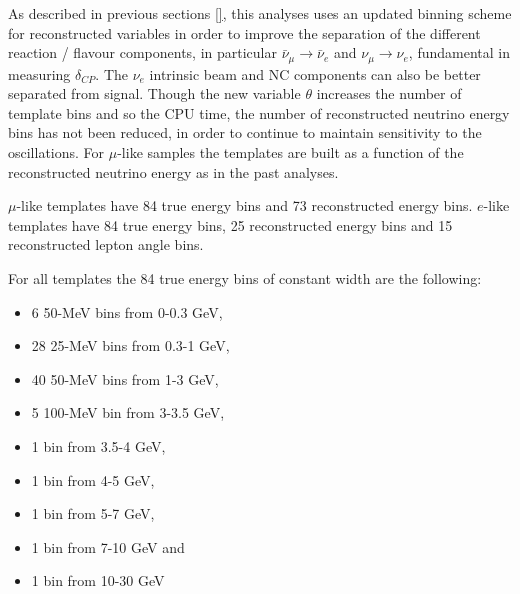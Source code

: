As described in previous sections \cref{}, this analyses uses an updated binning scheme for reconstructed variables
in order to improve the separation of the different reaction / flavour components,
in particular $\bar{\nu}_{\mu} \rightarrow \bar{\nu}_e$ and $\nu_{\mu} \rightarrow \nu_e$,
fundamental in measuring $\delta_{CP}$.
The $\nu_e$ intrinsic beam and NC components can also be better separated from signal.
Though the new variable $\theta$ increases the number of template bins and so the CPU time,
the number of reconstructed neutrino energy bins has not been reduced,
in order to continue to maintain sensitivity to the oscillations.
For $\mu$-like samples the templates are built as a function of the reconstructed neutrino energy
as in the past analyses.

$\mu$-like templates have 84 true energy bins and 73 reconstructed energy bins. $e$-like templates
have 84 true energy bins, 25 reconstructed energy bins and 15 reconstructed lepton angle bins.

For all templates the 84 true energy bins of constant width are the following:
\begin{itemize}
 \item   6 50-MeV bins from 0-0.3 GeV, 
 \item 28 25-MeV bins from 0.3-1 GeV,
 \item 40 50-MeV bins from 1-3 GeV,
 \item 5 100-MeV bin from 3-3.5 GeV,
 \item 1 bin from 3.5-4 GeV,
 \item 1 bin from 4-5 GeV,
 \item 1 bin from 5-7 GeV,
 \item 1 bin from 7-10 GeV and 
 \item 1 bin from 10-30 GeV
\end{itemize}



